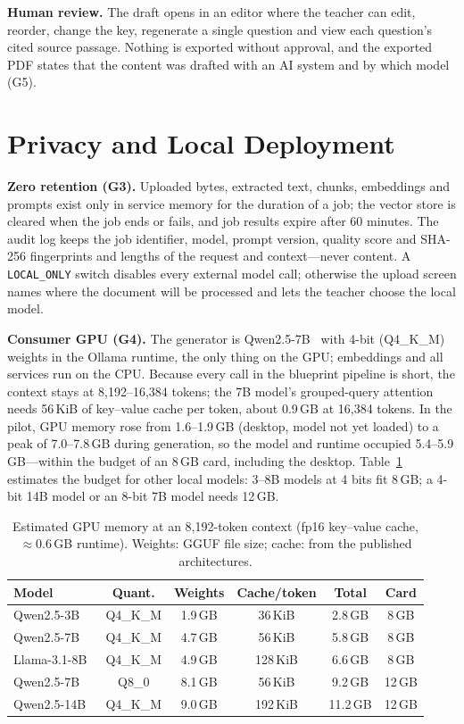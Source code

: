 \documentclass[conference]{IEEEtran}
\begin{document}
\textbf{Human review.} The draft opens in an editor where the teacher can edit, reorder, change the
key, regenerate a single question and view each question's cited source passage. Nothing is exported
without approval, and the exported PDF states that the content was drafted with an AI system and by
which model (G5).

\section{Privacy and Local Deployment}
\label{sec:privacy}

\textbf{Zero retention (G3).} Uploaded bytes, extracted text, chunks, embeddings and prompts exist only
in service memory for the duration of a job; the vector store is cleared when the job ends or fails,
and job results expire after 60 minutes. The audit log keeps the job identifier, model, prompt version,
quality score and SHA-256 fingerprints and lengths of the request and context---never content. A
\texttt{LOCAL\_ONLY} switch disables every external model call; otherwise the upload screen names where
the document will be processed and lets the teacher choose the local model.

\textbf{Consumer GPU (G4).} The generator is Qwen2.5-7B~\cite{qwen25} with 4-bit (Q4\_K\_M) weights in
the Ollama runtime, the only thing on the GPU; embeddings and all services run on the CPU. Because every
call in the blueprint pipeline is short, the context stays at 8{,}192--16{,}384 tokens; the 7B model's
grouped-query attention needs 56\,KiB of key--value cache per token, about 0.9\,GB at 16{,}384 tokens.
In the pilot, GPU memory rose from 1.6--1.9\,GB (desktop, model not yet loaded) to a peak of
7.0--7.8\,GB during generation, so the model and runtime occupied 5.4--5.9\,GB---within the budget of
an 8\,GB card, including the desktop. Table~\ref{tab:budget} estimates the budget for other local
models: 3--8B models at 4 bits fit 8\,GB; a 4-bit 14B model or an 8-bit 7B model needs 12\,GB.

\begin{table}[t]
\centering
\caption{Estimated GPU memory at an 8{,}192-token context (fp16 key--value cache, $\approx$0.6\,GB runtime).
Weights: GGUF file size; cache: from the published architectures.}
\label{tab:budget}
\footnotesize
\setlength{\tabcolsep}{3pt}
\begin{tabular}{@{}lccccc@{}}
\toprule
Model & Quant. & Weights & Cache/token & Total & Card \\
\midrule
Qwen2.5-3B  & Q4\_K\_M & 1.9\,GB & 36\,KiB  & 2.8\,GB  & 8\,GB \\
Qwen2.5-7B  & Q4\_K\_M & 4.7\,GB & 56\,KiB  & 5.8\,GB  & 8\,GB \\
Llama-3.1-8B~\cite{grattafiori2024llama3} & Q4\_K\_M & 4.9\,GB & 128\,KiB & 6.6\,GB & 8\,GB \\
Qwen2.5-7B  & Q8\_0    & 8.1\,GB & 56\,KiB  & 9.2\,GB  & 12\,GB \\
Qwen2.5-14B & Q4\_K\_M & 9.0\,GB & 192\,KiB & 11.2\,GB & 12\,GB \\
\bottomrule
\end{tabular}
\end{table}
\end{document}
